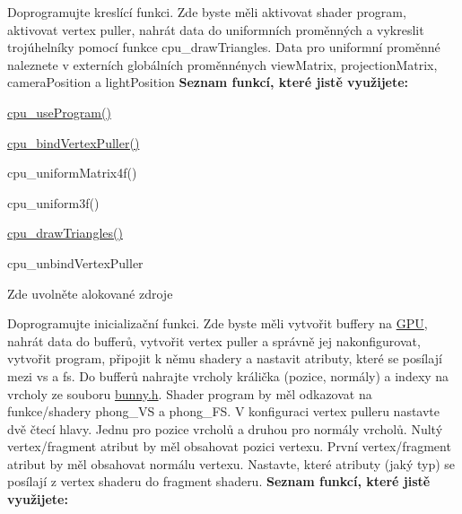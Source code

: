 \begin{DoxyRefList}
\item[\label{todo__todo000005}%
\Hypertarget{todo__todo000005}%
Global \hyperlink{group__cpu__side_ga077fd875cff025bec23bb738ac61278a}{phong\+\_\+on\+Draw} (void $\ast$a)]Doprogramujte kreslící funkci. Zde byste měli aktivovat shader program, aktivovat vertex puller, nahrát data do uniformních proměnných a vykreslit trojúhelníky pomocí funkce cpu\+\_\+draw\+Triangles. Data pro uniformní proměnné naleznete v externích globálních proměnnénych view\+Matrix, projection\+Matrix, camera\+Position a light\+Position {\bfseries Seznam funkcí, které jistě využijete\+:}
\begin{DoxyItemize}
\item \hyperlink{cpu_8c_abed0fbac42c4335409b29a19f13809f4}{cpu\+\_\+use\+Program()}
\item \hyperlink{cpu_8c_a18a87fa3883575459a9d12bd8c2c4fea}{cpu\+\_\+bind\+Vertex\+Puller()}
\item cpu\+\_\+uniform\+Matrix4f()
\item cpu\+\_\+uniform3f()
\item \hyperlink{cpu_8c_a13c52301446924ffbc425a07f8a14ed2}{cpu\+\_\+draw\+Triangles()}
\item cpu\+\_\+unbind\+Vertex\+Puller  
\end{DoxyItemize}
\item[\label{todo__todo000006}%
\Hypertarget{todo__todo000006}%
Global \hyperlink{group__cpu__side_gada78d4a6f5eb4c7cff394ae84b414e10}{phong\+\_\+on\+Exit} (void $\ast$a)]Zde uvolněte alokované zdroje  
\item[\label{todo__todo000004}%
\Hypertarget{todo__todo000004}%
Global \hyperlink{group__cpu__side_gab4efb950833c87be9cd3b3850be50e77}{phong\+\_\+on\+Init} (void $\ast$a)]Doprogramujte inicializační funkci. Zde byste měli vytvořit buffery na \hyperlink{structGPU}{G\+PU}, nahrát data do bufferů, vytvořit vertex puller a správně jej nakonfigurovat, vytvořit program, připojit k němu shadery a nastavit atributy, které se posílají mezi vs a fs. Do bufferů nahrajte vrcholy králička (pozice, normály) a indexy na vrcholy ze souboru \hyperlink{bunny_8h}{bunny.\+h}. Shader program by měl odkazovat na funkce/shadery phong\+\_\+\+VS a phong\+\_\+\+FS. V konfiguraci vertex pulleru nastavte dvě čtecí hlavy. Jednu pro pozice vrcholů a druhou pro normály vrcholů. Nultý vertex/fragment atribut by měl obsahovat pozici vertexu. První vertex/fragment atribut by měl obsahovat normálu vertexu. Nastavte, které atributy (jaký typ) se posílají z vertex shaderu do fragment shaderu. {\bfseries Seznam funkcí, které jistě využijete\+:}

\end{DoxyRefList}
